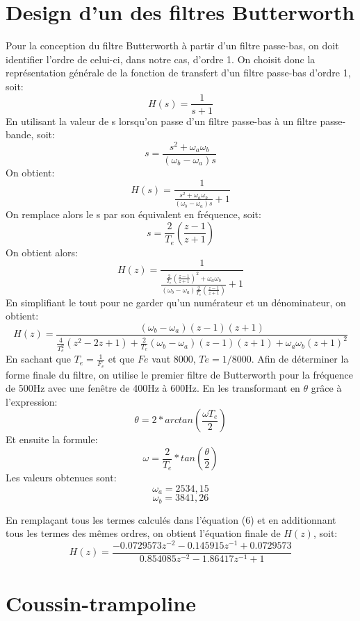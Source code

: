 \documentclass{article}
\begin{document}
\section{Design d'un des filtres Butterworth}
Pour la conception du filtre Butterworth à partir d'un filtre passe-bas, on doit identifier l'ordre de celui-ci, dans notre cas, d'ordre 1. On choisit donc la représentation générale de la fonction de transfert d'un filtre passe-bas d'ordre 1, soit:
\begin{equation}
H(s)=\frac{1}{s+1}
\end{equation}
En utilisant la valeur de s lorsqu'on passe d'un filtre passe-bas à un filtre passe-bande, soit:
\begin{equation}
s = \frac{s^2+\omega_a\omega_b}{(\omega_b-\omega_a)s}
\end{equation}
On obtient:
\begin{equation}
H(s)=\frac{1}{\frac{s^2+\omega_a\omega_b}{(\omega_b-\omega_a)s}+1}
\end{equation}
On remplace alors le s par son équivalent en fréquence, soit:
\begin{equation}
s=\frac{2}{T_e}(\frac{z-1}{z+1})
\end{equation}
On obtient alors:
\begin{equation}
H(z)=\frac{1}{\frac{\frac{2}{T_e}(\frac{z-1}{z+1})^2+\omega_a\omega_b}{(\omega_b-\omega_a)\frac{2}{T_e}(\frac{z-1}{z+1})}+1}
\end{equation}
En simplifiant le tout pour ne garder qu'un numérateur et un dénominateur, on obtient:
\begin{equation}
H(z)=\frac{(\omega_b-\omega_a)(z-1)(z+1)}{\frac{4}{T_e^2}(z^2-2z+1)+\frac{2}{T_e}(\omega_b-\omega_a)(z-1)(z+1)+\omega_a\omega_b(z+1)^2}
\end{equation}
En sachant que $T_e = \frac{1}{F_e}$ et que $Fe$ vaut 8000, $Te = 1/8000$.
Afin de déterminer la forme finale du filtre, on utilise le premier filtre de Butterworth pour la fréquence de 500Hz avec une fenêtre de 400Hz à 600Hz. En les transformant en $\theta$ grâce à l'expression:
\begin{equation}
\theta = 2*arctan(\frac{\omega T_e}{2})
\end{equation}
Et ensuite la formule:
\begin{equation}
\omega = \frac{2}{T_e}*tan(\frac{\theta}{2})
\end{equation}
Les valeurs obtenues sont:
\begin{equation}
\omega_a = 2534,15
\end{equation}
\begin{equation}
\omega_b = 3841,26
\end{equation}

En remplaçant tous les termes calculés dans l'équation (6) et en additionnant tous les termes des mêmes ordres, on obtient l'équation finale de $H(z)$, soit:
\begin{equation}
H(z)=\frac{-0.0729573z^{-2} - 0.145915z^{-1} + 0.0729573}{0.854085z^{-2} - 1.86417z^{-1} + 1}
\end{equation}

\section{Coussin-trampoline}
\end{document}
